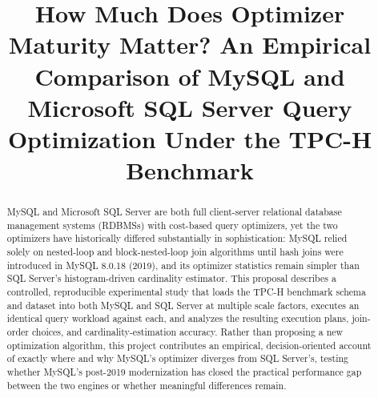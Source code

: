 \documentclass[conference]{IEEEtran}
\begin{document}
\title{How Much Does Optimizer Maturity Matter? An Empirical Comparison of MySQL and Microsoft SQL Server Query Optimization Under the TPC-H Benchmark}

\author{
}

\maketitle

\begin{abstract}
MySQL and Microsoft SQL Server are both full client-server relational database management systems (RDBMSs) with cost-based query optimizers, yet the two optimizers have historically differed substantially in sophistication: MySQL relied solely on nested-loop and block-nested-loop join algorithms until hash joins were introduced in MySQL 8.0.18 (2019), and its optimizer statistics remain simpler than SQL Server's histogram-driven cardinality estimator. This proposal describes a controlled, reproducible experimental study that loads the TPC-H benchmark schema and dataset into both MySQL and SQL Server at multiple scale factors, executes an identical query workload against each, and analyzes the resulting execution plans, join-order choices, and cardinality-estimation accuracy. Rather than proposing a new optimization algorithm, this project contributes an empirical, decision-oriented account of exactly where and why MySQL's optimizer diverges from SQL Server's, testing whether MySQL's post-2019 modernization has closed the practical performance gap between the two engines or whether meaningful differences remain.
\end{abstract}
\end{document}
